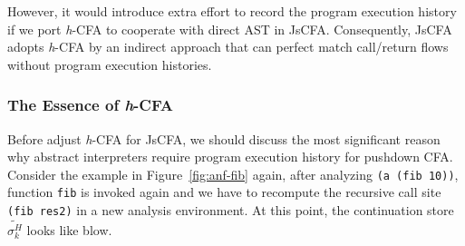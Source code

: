 \documentclass{article}
\begin{document}
However, it would introduce extra effort to record the program execution history if we port \textit{h}-CFA to cooperate with direct AST in JsCFA\@. Consequently, JsCFA adopts \textit{h}-CFA by an indirect approach that can perfect match call/return flows without program execution histories.

\subsubsection{The Essence of \textit{h}-CFA}
\label{subs:ehcfa}
Before adjust \textit{h}-CFA for JsCFA, we should discuss the most significant reason why abstract interpreters require program execution history for pushdown CFA\@. Consider the example in Figure~\ref{fig:anf-fib} again, after analyzing \verb|(a (fib 10))|, function \verb|fib| is invoked again and we have to recompute the recursive call site \verb|(fib res2)| in a new analysis environment. At this point, the continuation store $\widetilde{\sigma_k^H}$ looks like blow.
\end{document}
